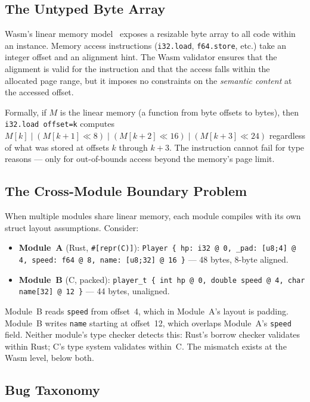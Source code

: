 \documentclass[sigplan,nonacm,screen]{acmart}
\begin{document}
\subsection{The Untyped Byte Array}

Wasm's linear memory model~\cite{wasmspec2024} exposes a resizable byte
array to all code within an instance. Memory access instructions
(\texttt{i32.load}, \texttt{f64.store}, etc.) take an integer offset and
an alignment hint. The Wasm validator ensures that the alignment is valid
for the instruction and that the access falls within the allocated page
range, but it imposes no constraints on the \emph{semantic content} at
the accessed offset.

Formally, if $M$ is the linear memory (a function from byte offsets to
bytes), then \texttt{i32.load offset=k} computes
$M[k] \mid (M[k{+}1] \ll 8) \mid (M[k{+}2] \ll 16) \mid (M[k{+}3] \ll 24)$
regardless of what was stored at offsets $k$ through $k{+}3$. The
instruction cannot fail for type reasons --- only for out-of-bounds
access beyond the memory's page limit.

\subsection{The Cross-Module Boundary Problem}

When multiple modules share linear memory, each module compiles with its
own struct layout assumptions. Consider:

\begin{itemize}
  \item \textbf{Module~A} (Rust, \texttt{\#[repr(C)]}):
    \texttt{Player \{ hp: i32 @ 0, \_pad: [u8;4] @ 4, speed: f64 @ 8, name: [u8;32] @ 16 \}}
    --- 48 bytes, 8-byte aligned.
  \item \textbf{Module~B} (C, packed):
    \texttt{player\_t \{ int hp @ 0, double speed @ 4, char name[32] @ 12 \}}
    --- 44 bytes, unaligned.
\end{itemize}

Module~B reads \texttt{speed} from offset~4, which in Module~A's layout
is padding. Module~B writes \texttt{name} starting at offset~12, which
overlaps Module~A's \texttt{speed} field. Neither module's type checker
detects this: Rust's borrow checker validates within Rust; C's type
system validates within~C. The mismatch exists at the Wasm level, below
both.

\subsection{Bug Taxonomy}
\end{document}

